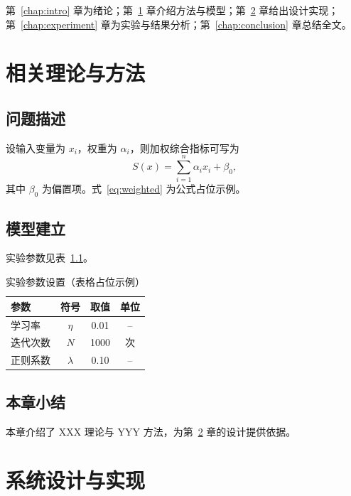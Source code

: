 \documentclass[UTF8,a4paper,zihao=-4,fontset=\swfontset,openany]{ctexbook}
\begin{document}
第~\ref{chap:intro} 章为绪论；第~\ref{chap:method} 章介绍方法与模型；第~\ref{chap:design} 章给出设计实现；第~\ref{chap:experiment} 章为实验与结果分析；第~\ref{chap:conclusion} 章总结全文。

\chapter{相关理论与方法}
\label{chap:method}

\section{问题描述}

设输入变量为 $x_i$，权重为 $\alpha_i$，则加权综合指标可写为
\begin{equation}
  S(x)=\sum_{i=1}^{n}\alpha_i x_i+\beta_0,
  \label{eq:weighted}
\end{equation}
其中 $\beta_0$ 为偏置项。式~\eqref{eq:weighted} 为公式占位示例。

\section{模型建立}

实验参数见表~\ref{tab:params}。

\begin{table}[htbp]
  \centering
  \caption{实验参数设置（表格占位示例）}
  \label{tab:params}
  \begin{tabular}{lccc}
    \toprule
    参数 & 符号 & 取值 & 单位 \\
    \midrule
    学习率     & $\eta$    & 0.01 & -- \\
    迭代次数   & $N$       & 1000 & 次 \\
    正则系数   & $\lambda$ & 0.10 & -- \\
    \bottomrule
  \end{tabular}
\end{table}

\section{本章小结}

本章介绍了 XXX 理论与 YYY 方法，为第~\ref{chap:design} 章的设计提供依据。

\chapter{系统设计与实现}
\label{chap:design}
\end{document}
